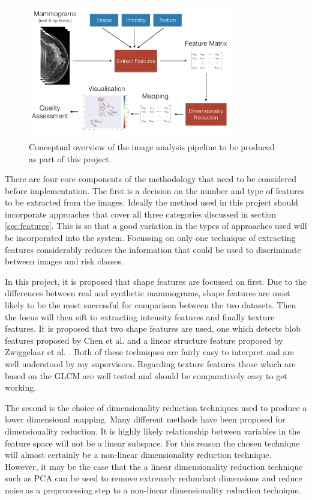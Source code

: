 \begin{figure}
	\label{fig:pipeline-diagram}
	\centering
	\includegraphics[width=0.8\textwidth]{Images/pipeline-diagram.png}	
	\caption{Conceptual overview of the image analysis pipeline to be produced as part of this project.}
\end{figure}

There are four core components of the methodology that need to be considered before implementation. The first is a decision on the number and type of features to be extracted from the images. Ideally the method used in this project should incorporate approaches that cover all three categories discussed in section \ref{sec:features}. This is so that a good variation in the types of approaches used will be incorporated into the system. Focussing on only one technique of extracting features considerably reduces the information that could be used to discriminate between images and risk classes. 

In this project, it is proposed that shape features are focussed on first. Due to the differences between real and synthetic mammograms, shape features are most likely to be the most successful for comparison between the two datasets. Then the focus will then sift to extracting intensity features and finally texture features. It is proposed that two shape features are used, one which detects blob features proposed by Chen et al. \cite{chen2013multiscale} and a linear structure feature proposed by Zwiggelaar et al. \cite{zwiggelaar1996finding}. Both of these techniques are fairly easy to interpret and are well understood by my supervisors. Regarding texture features those which are based on the GLCM \cite{haralick1973textural} are well tested and should be comparatively easy to get working. 

The second is the choice of dimensionality reduction techniques used to produce a lower dimensional mapping. Many different methods have been proposed for dimensionality reduction. It is highly likely relationship between variables in the feature space will not be a linear subspace. For this reason the chosen technique will almost certainly be a non-linear dimensionality reduction technique. However, it may be the case that the a linear dimensionality reduction technique such as PCA can be used to remove extremely redundant dimensions and reduce noise as a preprocessing step to a non-linear dimensionality reduction technique. 

